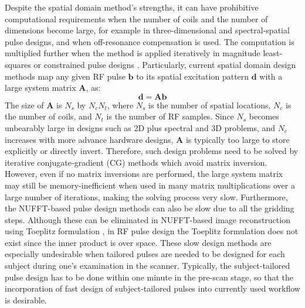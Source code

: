 \par Despite the spatial domain method's strengths, 
it can have prohibitive computational requirements when the number of coils and the number of dimensions become large, 
for example in three-dimensional and spectral-spatial pulse designs, and when off-resonance compensation is used.  
The computation is multiplied further when the method is applied iteratively in magnitude least-squares \cite{setsompop2008magnitude} or constrained pulse designs \cite{brunner2010optimal,hoyos:tmi:2014}. 
Particularly, current spatial domain design methods map any given RF pulse $\mathbf{b}$ to its spatial excitation pattern $\mathbf{d}$ with a large system matrix $\mathbf{A}$, as:
\begin{equation*}
	\mathbf{d}=\mathbf{Ab}
\end{equation*}
The size of $\mathbf{A}$ is $N_s$ by $N_cN_t$, where $N_s$ is the number of spatial locations, $N_c$ is the number of coils, and $N_t$ is the number of RF samples. 
Since $N_s$ becomes unbearably large in designs such as 2D plus spectral and 3D problems, 
and $N_c$ increases with more advance hardware designs, 
$\mathbf{A}$ is typically too large to store explicitly or directly invert. 
Therefore, such design problems need to be solved by iterative conjugate-gradient (CG) methods which avoid matrix inversion. 
However, even if no matrix inversions are performed, the large system matrix may still be memory-inefficient when used in many matrix multiplications over a large number of iterations, making the solving process very slow. Furthermore, the NUFFT-based pulse design methods can also be slow due to all the gridding steps.
Although these can be eliminated in NUFFT-based image reconstruction using Toeplitz formulation \cite{fessler2005toeplitz}, 
in RF pulse design the Toeplitz formulation does not exist since the inner product is over space. 
These slow design methods are especially undesirable when tailored pulses are needed to be designed for each subject during one's examination in the scanner. Typically, the subject-tailored pulse design has to be done within one minute in the pre-scan stage, so that the incorporation of fast design of subject-tailored pulses into currently used workflow is desirable.  


